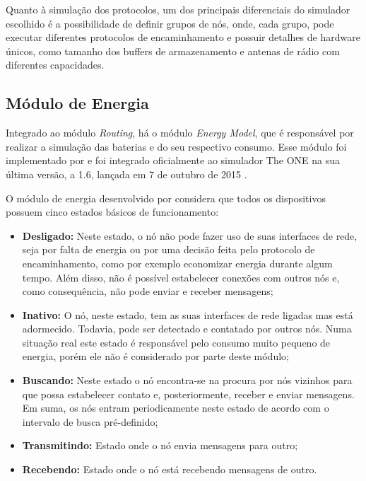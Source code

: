 Quanto à simulação dos protocolos, um dos principais diferenciais do simulador escolhido é a possibilidade de definir grupos de nós, onde, cada grupo, pode executar diferentes protocolos de encaminhamento e possuir detalhes de hardware únicos, como tamanho dos buffers de armazenamento e antenas de rádio com diferentes capacidades.

\subsection{Módulo de Energia}
\label{modulo_energia}
Integrado ao módulo \emph{Routing}, há o módulo \emph{Energy Model}, que é responsável por realizar a simulação das baterias e do seu respectivo consumo. Esse módulo foi implementado por \cite{denis_artigo} e foi integrado oficialmente ao simulador The ONE na sua última versão, a 1.6, lançada em 7 de outubro de 2015 \cite{theOne_github}.

O módulo de energia desenvolvido por \cite{denis_artigo} considera que todos os dispositivos possuem cinco estados básicos de funcionamento:

\begin{itemize}
    \item \textbf{Desligado:} Neste estado, o nó não pode fazer uso de suas interfaces de rede, seja por falta de energia ou por uma decisão feita pelo protocolo de encaminhamento, como por exemplo economizar energia durante algum tempo. Além disso, não é possível estabelecer conexões com outros nós e, como consequência, não pode enviar e receber mensagens;
    \item \textbf{Inativo:} O nó, neste estado, tem as suas interfaces de rede ligadas mas está adormecido. Todavia, pode ser detectado e contatado por outros nós. Numa situação real este estado é responsável pelo consumo muito pequeno de energia, porém ele não é considerado por parte deste módulo;
    \item \textbf{Buscando:} Neste estado o nó encontra-se na procura por nós vizinhos para que possa estabelecer contato e, posteriormente, receber e enviar mensagens. Em suma, os nós entram periodicamente neste estado de acordo com o intervalo de busca pré-definido;
    \item \textbf{Transmitindo:} Estado onde o nó envia mensagens para outro;
    \item \textbf{Recebendo:} Estado onde o nó está recebendo mensagens de outro.
\end{itemize}

